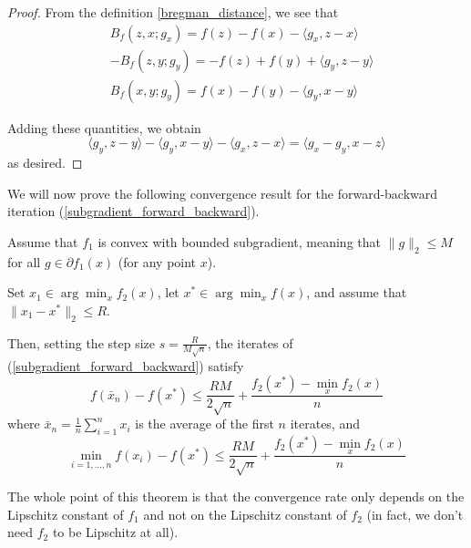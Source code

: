 \begin{proof}
 From the definition \ref{bregman_distance}, we see that
  \begin{align}
   &B_f(z,x;g_x) = f(z) - f(x) - \langle g_x, z - x\rangle \\
   &-B_f(z,y;g_y) = -f(z) + f(y) + \langle g_y, z - y\rangle \\
   & B_f(x,y;g_y) = f(x) - f(y) - \langle g_y, x - y\rangle
  \end{align}

  Adding these quantities, we obtain
  \begin{equation}
   \langle g_y, z - y\rangle - \langle g_y, x - y\rangle - \langle g_x, z - x\rangle = \langle g_x - g_y, x - z\rangle
  \end{equation}
  as desired.
\end{proof}

We will now prove the following convergence result for the forward-backward iteration (\ref{subgradient_forward_backward}). 

\begin{theorem}\label{forward_backward_subgradient_thm}
 Assume that $f_1$ is convex with bounded subgradient, meaning that $\|g\|_2 \leq M$ for all $g\in \partial f_1(x)$ (for any point $x$).
 
 Set $x_1 \in \arg\min_xf_2(x)$, let $x^*\in \arg\min_x f(x)$, and assume that $\|x_1 - x^*\|_2 \leq R$. 
 
 Then, setting the step size $s = \frac{R}{M\sqrt{n}}$,
 the iterates of (\ref{subgradient_forward_backward}) satisfy
 \begin{equation}
  f(\bar{x}_n) - f(x^*) \leq \frac{RM}{2\sqrt{n}} + \frac{f_2(x^*) - \min_x f_2(x)}{n}
 \end{equation}
 where $\bar{x}_n = \frac{1}{n}\sum_{i = 1}^n x_i$ is the average of the first $n$ iterates, and
 \begin{equation}
  \min_{i=1,...,n} f(x_i) - f(x^*) \leq \frac{RM}{2\sqrt{n}} + \frac{f_2(x^*) - \min_x f_2(x)}{n}
 \end{equation}

\end{theorem}
The whole point of this theorem is that the convergence rate only depends on the Lipschitz constant
of $f_1$ and not on the Lipschitz constant of $f_2$ (in fact, we don't need $f_2$ to be Lipschitz at all).


